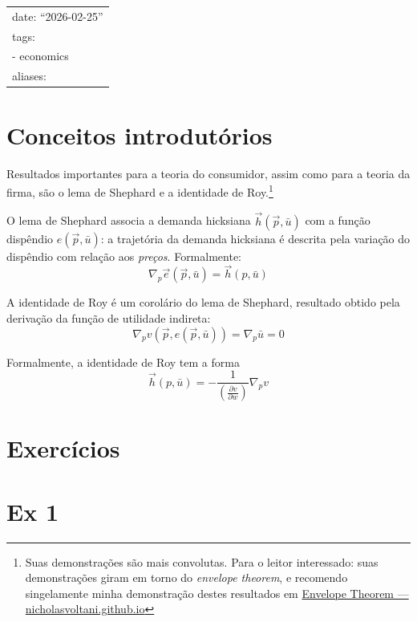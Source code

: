\documentclass[12pt]{article}
\title{}
\author{}
\date{}
\numberwithin{equation}{section}
\theoremstyle{plain}
\theoremstyle{definition}
\theoremstyle{remark}
\begin{document}
\maketitle

\begin{longtable}[]{@{}l@{}}
\toprule\noalign{}
\endhead
\bottomrule\noalign{}
\endlastfoot
date: ``2026-02-25'' \\
tags: \\
- economics \\
aliases: \\
\end{longtable}

\hypertarget{conceitos-introdutuxf3rios}{%
\section{Conceitos introdutórios}\label{conceitos-introdutuxf3rios}}

Resultados importantes para a teoria do consumidor, assim como para a teoria da firma, são o lema de Shephard e a identidade de Roy.\footnote{Suas demonstrações são mais convolutas. Para o leitor interessado: suas demonstrações giram em torno do \textit{envelope theorem}, e recomendo singelamente minha demonstração destes resultados em \href{https://nicholasvoltani.github.io/Envelope-Theorem}{Envelope Theorem --- nicholasvoltani.github.io}}

O lema de Shephard associa a demanda hicksiana \(\vec{h}(\vec{p}, \bar{u})\) com a função dispêndio \(e(\vec{p}, \bar{u})\): a trajetória da demanda hicksiana é descrita pela variação do dispêndio com relação aos \textit{preços}. Formalmente:
\[
\nabla_{p} {\vec{e}(\vec{p}, \bar{u})} = \vec{h}(p, \bar{u}) 
\]

A identidade de Roy é um corolário do lema de Shephard, resultado obtido pela derivação da função de utilidade indireta:
\[
\nabla_{p} v\left(\vec{p}, e(\vec{p}, \bar{u})\right) = \nabla_{p} \bar{u} = 0
\]

Formalmente, a identidade de Roy tem a forma
\[
\vec{h}(p, \bar{u}) = -\frac{1}{\left( \frac{ \partial v }{ \partial w } \right) } \nabla_{p}v
\]

\hypertarget{exercuxedcios}{%
\section{Exercícios}\label{exercuxedcios}}

\hypertarget{ex-1}{%
\section{Ex 1}\label{ex-1}}
\end{document}
